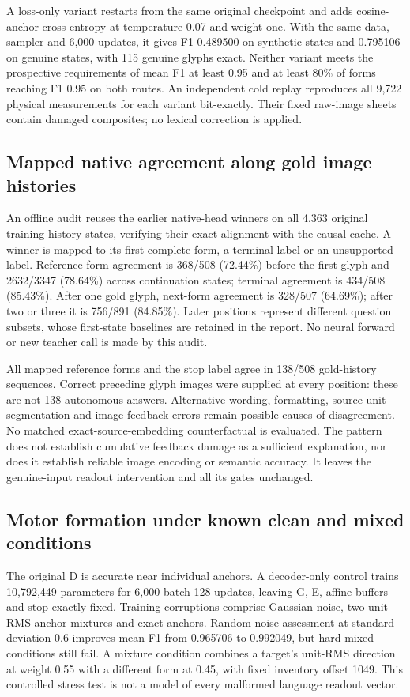 A loss-only variant restarts from the same original checkpoint and adds
cosine-anchor cross-entropy at temperature 0.07 and weight one. With the
same data, sampler and 6,000 updates, it gives F1 0.489500 on synthetic
states and 0.795106 on genuine states, with 115 genuine glyphs exact.
Neither variant meets the prospective requirements of mean F1 at least
0.95 and at least 80\% of forms reaching F1 0.95 on both routes.
An independent cold replay reproduces all 9,722 physical measurements for
each variant bit-exactly. Their fixed raw-image sheets contain damaged
composites; no lexical correction is applied.

\subsection*{Mapped native agreement along gold image histories}
An offline audit reuses the earlier native-head winners on all 4,363 original
training-history states, verifying their exact alignment with the causal
cache. A winner is mapped to its first complete form, a terminal label or an
unsupported label. Reference-form agreement is 368/508 (72.44\%) before the
first glyph and 2632/3347 (78.64\%) across continuation states; terminal
agreement is 434/508 (85.43\%). After one gold glyph, next-form agreement is
328/507 (64.69\%); after two or three it is 756/891 (84.85\%). Later positions
represent different question subsets, whose first-state baselines are retained
in the report. No neural forward or new teacher call is made by this audit.

All mapped reference forms and the stop label agree in 138/508 gold-history
sequences. Correct preceding glyph images were supplied at every position:
these are not 138 autonomous answers. Alternative wording, formatting,
source-unit segmentation and image-feedback errors remain possible causes of
disagreement. No matched exact-source-embedding counterfactual is evaluated.
The pattern does not establish cumulative feedback damage as a sufficient
explanation, nor does it establish reliable image encoding or semantic accuracy.
It leaves the genuine-input readout intervention and all its gates unchanged.

\subsection*{Motor formation under known clean and mixed conditions}
The original D is accurate near individual anchors. A decoder-only control
trains 10,792,449 parameters for 6,000 batch-128 updates, leaving G, E, affine
buffers and stop exactly fixed. Training corruptions comprise Gaussian noise,
two unit-RMS-anchor mixtures and exact anchors. Random-noise assessment
at standard deviation 0.6 improves mean F1 from 0.965706 to 0.992049, but
hard mixed conditions still fail. A mixture condition combines a target's
unit-RMS direction at weight 0.55 with a different form at 0.45, with fixed
inventory offset 1049. This controlled stress test is not a model of every
malformed language readout vector.

